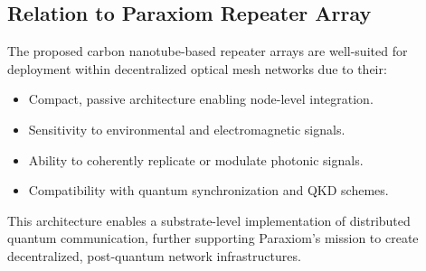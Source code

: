 \documentclass[11pt]{article}
\begin{document}
	\subsection*{Relation to Paraxiom Repeater Array}
	The proposed carbon nanotube-based repeater arrays are well-suited for deployment within decentralized optical mesh networks due to their:
	\begin{itemize}
		\item Compact, passive architecture enabling node-level integration.
		\item Sensitivity to environmental and electromagnetic signals.
		\item Ability to coherently replicate or modulate photonic signals.
		\item Compatibility with quantum synchronization and QKD schemes.
	\end{itemize}
	
	This architecture enables a substrate-level implementation of distributed quantum communication, further supporting Paraxiom's mission to create decentralized, post-quantum network infrastructures.
	
\end{document}
